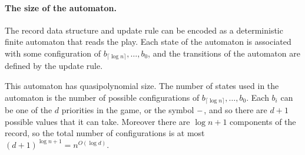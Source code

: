 \paragraph{\bf The size of the automaton.}
The record data structure and update rule can be encoded as a deterministic
finite automaton that reads the play. Each state of the automaton is associated
with some configuration of $b_{\lceil \log n \rceil}, \dots, b_0$, and the
transitions of the automaton are defined by the update rule. 

This automaton has quasipolynomial size. The number of states used in the
automaton is the number of possible configurations of
$b_{\lceil \log n \rceil}, \dots, b_0$. Each $b_i$ can be one of the $d$
priorities in the game, or the symbol $\mathtt{-}$, and so there are $d + 1$
possible values that it can take. Moreover there are $\log n + 1$ components of
the record, so the total number of configurations is at most
$(d+1)^{\log n +1} = n^{O(\log d)}$.

